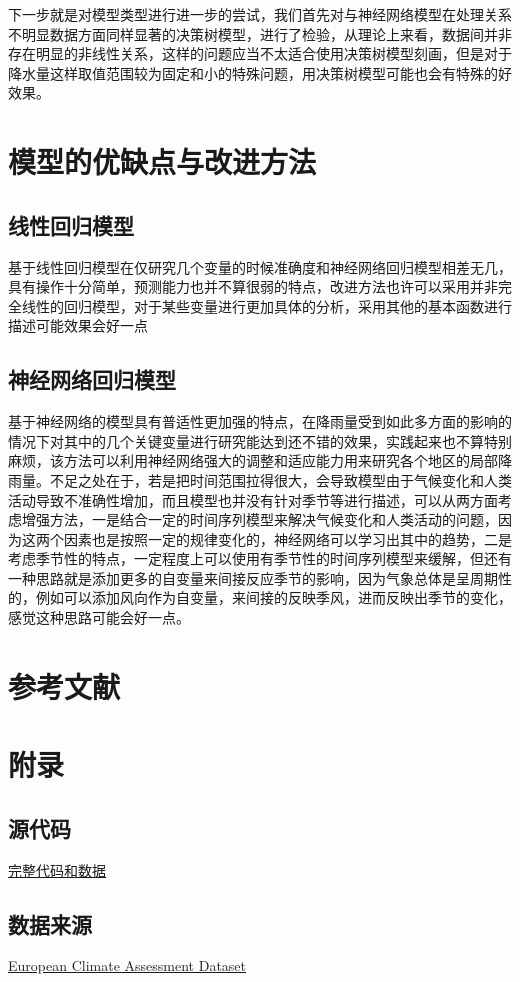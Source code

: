 \documentclass[UTF8, a4paper]{ctexart}
\begin{document}
下一步就是对模型类型进行进一步的尝试，我们首先对与神经网络模型在处理关系不明显数据方面同样显著的决策树模型，进行了检验，从理论上来看，数据间并非存在明显的非线性关系，这样的问题应当不太适合使用决策树模型刻画，但是对于降水量这样取值范围较为固定和小的特殊问题，用决策树模型可能也会有特殊的好效果。




\section{模型的优缺点与改进方法}

\subsection{线性回归模型}
基于线性回归模型在仅研究几个变量的时候准确度和神经网络回归模型相差无几，具有操作十分简单，预测能力也并不算很弱的特点，改进方法也许可以采用并非完全线性的回归模型，对于某些变量进行更加具体的分析，采用其他的基本函数进行描述可能效果会好一点

\subsection{神经网络回归模型}
基于神经网络的模型具有普适性更加强的特点，在降雨量受到如此多方面的影响的情况下对其中的几个关键变量进行研究能达到还不错的效果，实践起来也不算特别麻烦，该方法可以利用神经网络强大的调整和适应能力用来研究各个地区的局部降雨量。不足之处在于，若是把时间范围拉得很大，会导致模型由于气候变化和人类活动导致不准确性增加，而且模型也并没有针对季节等进行描述，可以从两方面考虑增强方法，一是结合一定的时间序列模型来解决气候变化和人类活动的问题，因为这两个因素也是按照一定的规律变化的，神经网络可以学习出其中的趋势，二是考虑季节性的特点，一定程度上可以使用有季节性的时间序列模型来缓解，但还有一种思路就是添加更多的自变量来间接反应季节的影响，因为气象总体是呈周期性的，例如可以添加风向作为自变量，来间接的反映季风，进而反映出季节的变化，感觉这种思路可能会好一点。

\section{参考文献}


\appendix
\setcounter{secnumdepth}{-2}
\section{附录}

\setcounter{secnumdepth}{3}
\subsection{源代码}

\href{https://github.com/limuy2022/math_model}{完整代码和数据}

\subsection{数据来源}

\href{https://www.ecad.eu/}{European Climate Assessment  Dataset}
\end{document}
